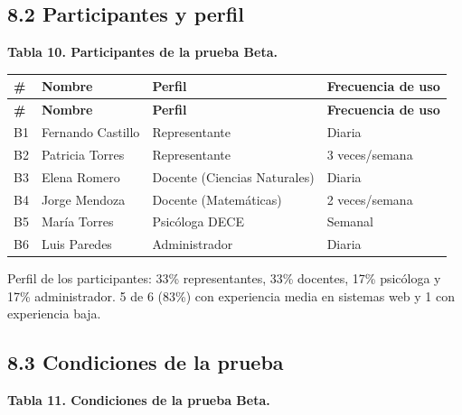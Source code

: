 \documentclass[11pt,a4paper]{article}
\begin{document}
\subsection*{8.2 Participantes y perfil}


\textbf{Tabla 10. Participantes de la prueba Beta.}


{\small
\begin{longtable}{|p{}|p{}|p{}|p{}|}
\rowcolor{UTECblue}\color{white}\bfseries \# & \color{white}\bfseries Nombre & \color{white}\bfseries Perfil & \color{white}\bfseries Frecuencia de uso \\ \hline
\endfirsthead
\rowcolor{UTECblue}\color{white}\bfseries \# & \color{white}\bfseries Nombre & \color{white}\bfseries Perfil & \color{white}\bfseries Frecuencia de uso \\ \hline
\endhead
B1 & Fernando Castillo & Representante & Diaria \\ \hline
B2 & Patricia Torres & Representante & 3 veces/semana \\ \hline
B3 & Elena Romero & Docente (Ciencias Naturales) & Diaria \\ \hline
B4 & Jorge Mendoza & Docente (Matemáticas) & 2 veces/semana \\ \hline
B5 & María Torres & Psicóloga DECE & Semanal \\ \hline
B6 & Luis Paredes & Administrador & Diaria \\ \hline
\end{longtable}}


Perfil de los participantes: 33\% representantes, 33\% docentes, 17\% psicóloga y 17\% administrador. 5 de 6 (83\%) con experiencia media en sistemas web y 1 con experiencia baja.


\subsection*{8.3 Condiciones de la prueba}


\textbf{Tabla 11. Condiciones de la prueba Beta.}
\end{document}
